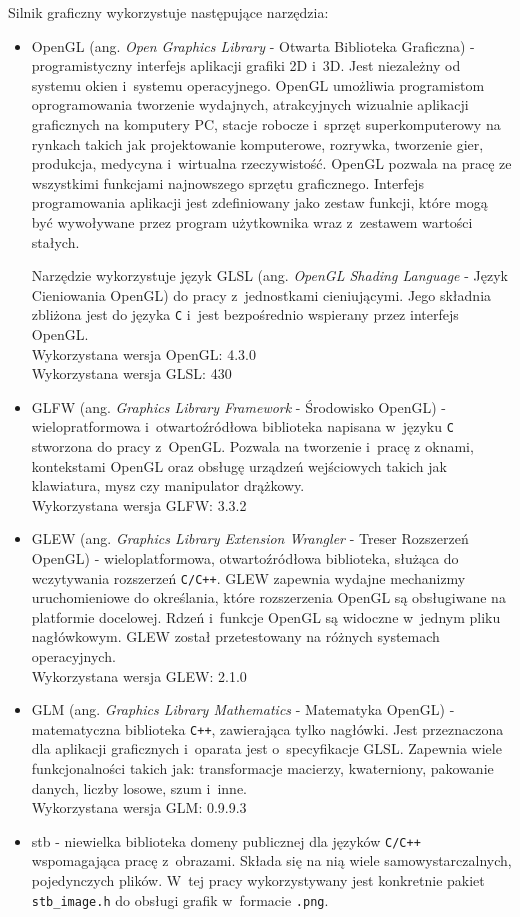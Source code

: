 \documentclass[a4paper,twoside,12pt]{book}
\newcommand{\obcy}[1]{\emph{#1}}
\newcommand{\ang}[1]{{\selectlanguage{british}\obcy{#1}}}
\begin{document}
Silnik graficzny wykorzystuje następujące narzędzia:
\begin{itemize}
    \item OpenGL (ang. \ang{Open Graphics Library} - Otwarta Biblioteka Graficzna) - programistyczny interfejs aplikacji grafiki 2D i~3D. Jest niezależny od systemu okien i~systemu operacyjnego. OpenGL umożliwia programistom oprogramowania tworzenie wydajnych, atrakcyjnych wizualnie aplikacji graficznych na komputery PC, stacje robocze i~sprzęt superkomputerowy na rynkach takich jak projektowanie komputerowe, rozrywka, tworzenie gier, produkcja, medycyna i~wirtualna rzeczywistość. OpenGL pozwala na pracę ze wszystkimi funkcjami najnowszego sprzętu graficznego. Interfejs programowania aplikacji jest zdefiniowany jako zestaw funkcji, które mogą być wywoływane przez program użytkownika wraz z~zestawem wartości stałych.
    
    Narzędzie wykorzystuje język GLSL (ang. \ang{OpenGL Shading Language} - Język Cieniowania OpenGL) do pracy z~jednostkami cieniującymi. Jego składnia zbliżona jest do języka \texttt{C} i~jest bezpośrednio wspierany przez interfejs OpenGL. \\
    Wykorzystana wersja OpenGL: 4.3.0 \\
    Wykorzystana wersja GLSL: 430
    \item GLFW (ang. \ang{Graphics Library Framework} - Środowisko OpenGL) - wielopratformowa i~otwartoźródłowa biblioteka napisana w~języku \texttt{C} stworzona do pracy z~OpenGL. Pozwala na tworzenie i~pracę z oknami, kontekstami OpenGL oraz obsługę urządzeń wejściowych takich jak klawiatura, mysz czy manipulator drążkowy. \\
    Wykorzystana wersja GLFW: 3.3.2
    \item GLEW (ang. \ang{Graphics Library Extension Wrangler} - Treser Rozszerzeń OpenGL) - wieloplatformowa, otwartoźródłowa biblioteka, służąca do wczytywania rozszerzeń \texttt{C/C++}. GLEW zapewnia wydajne mechanizmy uruchomieniowe do określania, które rozszerzenia OpenGL są obsługiwane na platformie docelowej. Rdzeń i~funkcje OpenGL są widoczne w~jednym pliku nagłówkowym. GLEW został przetestowany na różnych systemach operacyjnych. \\
    Wykorzystana wersja GLEW: 2.1.0
    \item GLM (ang. \ang{Graphics Library Mathematics} - Matematyka OpenGL) - matematyczna biblioteka \texttt{C++}, zawierająca tylko nagłówki. Jest przeznaczona dla aplikacji graficznych i~oparata jest o~specyfikacje GLSL. Zapewnia wiele funkcjonalności takich jak: transformacje macierzy, kwaterniony, pakowanie danych, liczby losowe, szum i~inne.\\
    Wykorzystana wersja GLM: 0.9.9.3
    \item stb - niewielka biblioteka domeny publicznej dla języków \texttt{C/C++} wspomagająca pracę z~obrazami. Składa się na nią wiele samowystarczalnych, pojedynczych plików. W~tej pracy wykorzystywany jest konkretnie pakiet \texttt{stb\_image.h} do obsługi grafik w~formacie \texttt{.png}.
\end{itemize}
\end{document}
